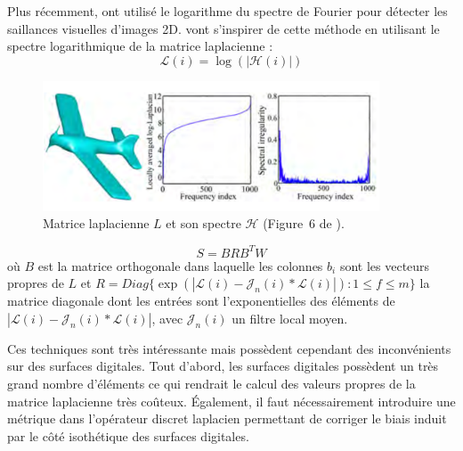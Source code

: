 Plus récemment,  ont utilisé le logarithme du spectre de
Fourier pour détecter les saillances visuelles d'images 2D.  vont
s'inspirer de cette méthode en utilisant le spectre logarithmique de la matrice
laplacienne :
%
\begin{equation}
  \mathcal{L}(i) = \log(|\mathcal{H}(i)|)
\end{equation}

\begin{figure}[ht]{
    \begin{center}
    \includegraphics[width=10cm]{images/Feature/LaplacianSpectrumLogAvg}
    \end{center}}
    \caption[Matrice laplacienne et son spectre.]{Matrice laplacienne $L$ et son spectre $\mathcal{H}$ (Figure~6 de \cite{Song2014}).
      \label{fig:laplacian-spectrum-avg}}
\end{figure}


\begin{equation}
  S = BRB^TW
\end{equation}
%
où $B$ est la matrice orthogonale dans laquelle les colonnes $b_i$ sont les
vecteurs propres de $L$ et $R = Diag\{\exp(|\mathcal{L}(i) - \mathcal{J}_n(i)
\ast \mathcal{L}(i)|) : 1 \le f \le m\}$ la matrice diagonale dont les entrées
sont l'exponentielles des éléments de $|\mathcal{L}(i) - \mathcal{J}_n(i) \ast
\mathcal{L}(i)|$, avec $\mathcal{J}_n(i)$ un filtre local moyen.




Ces techniques sont très intéressante mais possèdent cependant des inconvénients
sur des surfaces digitales. Tout d'abord, les surfaces digitales possèdent un
très grand nombre d'éléments ce qui rendrait le calcul des valeurs propres de la
matrice laplacienne très coûteux. Également, il faut nécessairement introduire
une métrique dans l'opérateur discret laplacien permettant de corriger le biais
induit par le côté isothétique des surfaces digitales.


